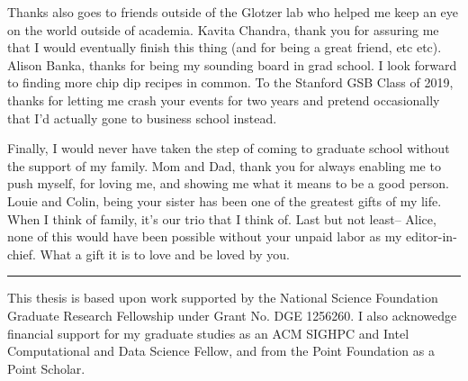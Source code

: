 Thanks also goes to friends outside of the Glotzer lab who helped me keep an eye on the world outside of academia.
Kavita Chandra, thank you for assuring me that I would eventually finish this thing (and for being a great friend, etc etc).
Alison Banka, thanks for being my sounding board in grad school. I look forward to finding more chip dip recipes in common.
To the Stanford GSB Class of 2019, thanks for letting me crash your events for two years and pretend occasionally that I'd actually gone to business school instead.

Finally, I would never have taken the step of coming to graduate school without the support of my family.
Mom and Dad, thank you for always enabling me to push myself, for loving me, and showing me what it means to be a good person.
Louie and Colin, being your sister has been one of the greatest gifts of my life. When I think of family, it's our trio that I think of.
Last but not least-- Alice, none of this would have been possible without your unpaid labor as my editor-in-chief. What a gift it is to love and be loved by you.

\begin{center}\rule{5in}{1pt}\end{center}

This thesis is based upon work supported by the National Science Foundation Graduate Research Fellowship under Grant No. DGE 1256260.
I also acknowedge financial support for my graduate studies as an ACM SIGHPC and Intel Computational and Data Science Fellow, and from the Point Foundation as a Point Scholar.
